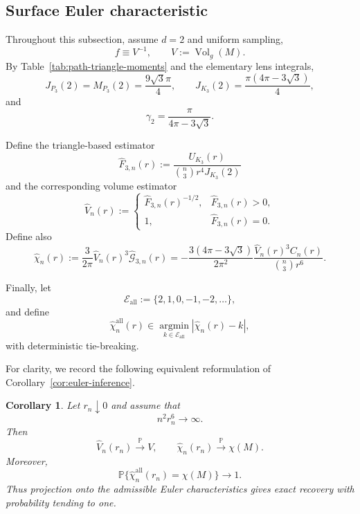 \documentclass[11pt]{article}
\newtheorem{corollary}[theorem]{Corollary}
\theoremstyle{remark}
\newcommand{\Vol}{\operatorname{Vol}}
\newcommand{\Pp}{\mathbb P}
\numberwithin{equation}{section}
\begin{document}
\subsection{Surface Euler characteristic}

Throughout this subsection, assume $d=2$ and uniform sampling,
\[
f\equiv V^{-1},
\qquad
V:=\Vol_g(M).
\]
By Table~\ref{tab:path-triangle-moments} and the elementary lens integrals,
\[
J_{P_3}(2)=M_{P_3}(2)=\frac{9\sqrt3\pi}{4},
\qquad
J_{K_3}(2)=\frac{\pi(4\pi-3\sqrt3)}4,
\]
and
\[
\gamma_2=\frac{\pi}{4\pi-3\sqrt3}.
\]

Define the triangle-based estimator
\[
\widehat F_{3,n}(r)
:=
\frac{U_{K_3}(r)}
{\binom n3 r^4J_{K_3}(2)}
\]
and the corresponding volume estimator
\[
\widehat V_n(r):=
\begin{cases}
\widehat F_{3,n}(r)^{-1/2},
&\widehat F_{3,n}(r)>0,\\
1,
&\widehat F_{3,n}(r)=0.
\end{cases}
\]
Define also
\[
\widehat\chi_n(r)
:=
\frac{3}{2\pi}\widehat V_n(r)^3
\widehat{\mathcal G}_{3,n}(r)
=
-\frac{3(4\pi-3\sqrt3)}{2\pi^2}
\frac{\widehat V_n(r)^3C_n(r)}
{\binom n3r^6}.
\]

Finally, let
\[
\mathcal E_{\mathrm{all}}
:=
\{2,1,0,-1,-2,\ldots\},
\]
and define
\[
\widehat\chi_n^{\mathrm{all}}(r)
\in
\operatorname*{argmin}_{k\in\mathcal E_{\mathrm{all}}}
|\widehat\chi_n(r)-k|,
\]
with deterministic tie-breaking.

For clarity, we record the following equivalent reformulation of
Corollary~\ref{cor:euler-inference}.

\begin{corollary}
\label{cor:euler-inference-revise}
Let $r_n\downarrow0$ and assume that
\[
n^2r_n^6\longrightarrow\infty.
\]
Then
\[
\widehat V_n(r_n)\xrightarrow{\Pp}V,
\qquad
\widehat\chi_n(r_n)\xrightarrow{\Pp}\chi(M).
\]
Moreover,
\[
\Pp\{
\widehat\chi_n^{\mathrm{all}}(r_n)=\chi(M)
\}
\longrightarrow1.
\]
Thus projection onto the admissible Euler characteristics gives exact
recovery with probability tending to one.
\end{corollary}
\end{document}
